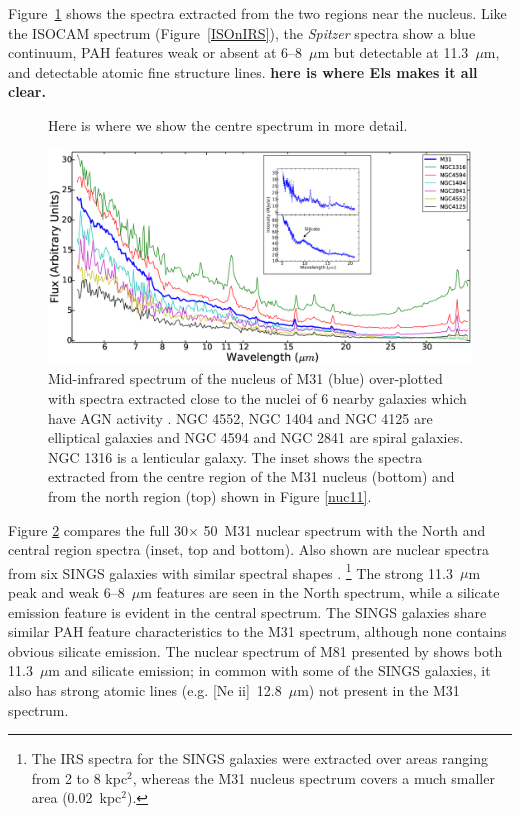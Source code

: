 Figure~\ref{fig:nuc_detail} shows the spectra extracted from the two regions near the nucleus.
Like the ISOCAM spectrum (Figure~\ref{ISOnIRS}), the  {\em Spitzer} spectra show a blue
continuum, PAH features weak or absent at 6--8~$\mu$m  but detectable at 11.3~$\mu$m, and detectable atomic fine structure lines.
{\bf here is where Els makes it all clear.}

\begin{figure}
\centering
\caption{Here is where we show the centre spectrum in more detail.}
\label{fig:nuc_detail}
\end{figure}


\begin{figure}
\centering
\includegraphics[height = 8 cm]{./SINGSspec.eps}
\caption{Mid-infrared spectrum of the nucleus of M31 (blue) over-plotted with spectra extracted close to the nuclei of 6 nearby galaxies which have 
AGN activity \citep{Smith:2007lr}. NGC 4552, NGC 1404 and NGC 4125 are elliptical galaxies and NGC 4594 and NGC 2841 are spiral galaxies. 
NGC 1316 is a lenticular galaxy. The inset shows the spectra extracted from the centre region of the M31 nucleus (bottom) and from the north region (top) 
shown in Figure \ref{nuc11}.}
\label{smithspec}
\end{figure}

Figure \ref{smithspec} compares the full 30\arcsec $\times$ 50\arcsec\ M31 nuclear spectrum with
the North and central region spectra (inset, top and bottom). Also shown are nuclear spectra
from six SINGS galaxies with similar spectral shapes \citep{Smith:2007lr}.%
\footnote{The IRS spectra for the SINGS galaxies were extracted over areas ranging from 2 to 8 kpc$^2$, whereas the M31
nucleus spectrum covers a much smaller area (0.02~kpc$^2$).}
The strong 11.3~$\mu$m peak  and weak 6--8~$\mu$m features are  seen  in the
North spectrum, while a silicate emission feature is evident in the central spectrum.
The SINGS galaxies share similar PAH feature characteristics to the M31 spectrum, although none
contains obvious silicate emission. The nuclear spectrum of M81 presented by \citet{Smith2010}
shows both 11.3~$\mu$m  and silicate emission; in common with some of the SINGS galaxies,
it also has strong atomic lines (e.g. [Ne {\sc ii}]~12.8~$\mu$m) not present in the M31 spectrum.


